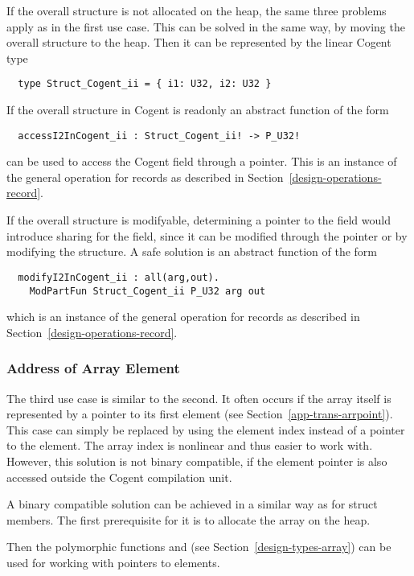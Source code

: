 If the overall structure is not allocated on the heap, the same three problems apply as in the first use case.
This can be solved in the same way, by moving the overall structure to the heap. Then it can be represented
by the linear Cogent type
\begin{verbatim}
  type Struct_Cogent_ii = { i1: U32, i2: U32 }
\end{verbatim}

If the overall structure in Cogent is readonly an abstract function of the form
\begin{verbatim}
  accessI2InCogent_ii : Struct_Cogent_ii! -> P_U32!
\end{verbatim}
can be used to access the Cogent field through a pointer. This is an instance of the general  operation
for records as described in Section~\ref{design-operations-record}.

If the overall structure is modifyable, determining a pointer to the field would introduce sharing for the
field, since it can be modified through the pointer or by modifying the structure. A safe solution is an 
abstract function of the form
\begin{verbatim}
  modifyI2InCogent_ii : all(arg,out). 
    ModPartFun Struct_Cogent_ii P_U32 arg out
\end{verbatim}
which is an instance of the general  operation
for records as described in Section~\ref{design-operations-record}.

\subsubsection{Address of Array Element}

The third use case is similar to the second. It often occurs if the array itself is represented by a pointer to its first
element (see Section~\ref{app-trans-arrpoint}). This case can simply be replaced by using the element index instead of a 
pointer to the element. The array index is nonlinear and thus easier to work with. However, this solution is not binary
compatible, if the element pointer is also accessed outside the Cogent compilation unit.

A binary compatible solution can be achieved in a similar way as for struct members. The first prerequisite for it is
to allocate the array on the heap.

Then the polymorphic functions  and  (see Section~\ref{design-types-array}) can be used
for working with pointers to elements.

